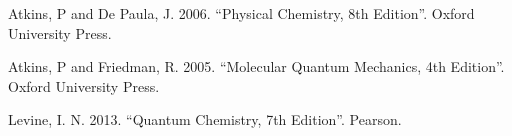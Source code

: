 \documentclass{tufte-book}
\begin{document}















\begin{thebibliography}{}
 Atkins, P and De Paula, J. 2006. ``Physical Chemistry, 8th Edition''. Oxford University Press.

 Atkins, P and Friedman, R. 2005. ``Molecular Quantum Mechanics, 4th Edition''. Oxford University Press.

 Levine, I. N. 2013. ``Quantum
Chemistry, 7th Edition''. Pearson.
\end{thebibliography}


%
\end{document}
